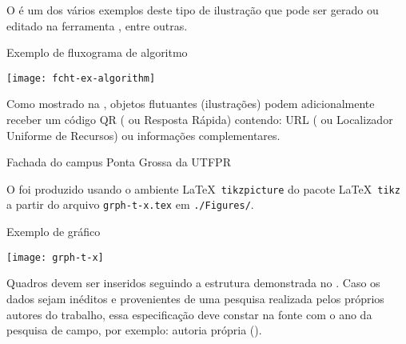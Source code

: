 \documentclass[%
  a4paper,%
  12pt,%
  fleqn,%
  english,%
  brazilian,%
]{article}
\begin{document}
O  é um dos vários exemplos deste tipo de ilustração que pode ser gerado ou editado na ferramenta , entre outras.

\begin{flowchart}[!htbp]
\caption{Exemplo de fluxograma de algoritmo}%
\label{fcht:ex-algorithm}
\texttt{[image: fcht-ex-algorithm]}
\end{flowchart}

Como mostrado na , objetos flutuantes (ilustrações) podem adicionalmente receber um código QR ( ou Resposta Rápida) contendo: URL ( ou Localizador Uniforme de Recursos) ou informações complementares.

\begin{photograph}[!htbp]
\caption{Fachada do campus Ponta Grossa da UTFPR}%
\label{phot:pg-campus}
%
\end{photograph}

O  foi produzido usando o ambiente \LaTeX\ \texttt{tikzpicture} do pacote \LaTeX\ \texttt{tikz} a partir do arquivo \texttt{grph-t-x.tex} em \texttt{./Figures/}.

\begin{graph}[!htbp]
\caption{Exemplo de gráfico}%
\label{grph:t-x}
\texttt{[image: grph-t-x]}
\end{graph}

Quadros devem ser inseridos seguindo a estrutura demonstrada no .
Caso os dados sejam inéditos e provenientes de uma pesquisa realizada pelos próprios autores do trabalho, essa especificação deve constar na fonte com o ano da pesquisa de campo, por exemplo: autoria própria (\YearNum).
\end{document}
